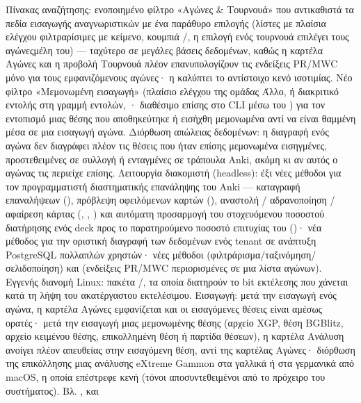 \documentclass[letterpaper,10pt,greek]{sphinxmanual}
\begin{document}
\begin{savenotes}
\begin{longtable}{}
\begin{varwidth}[t]{}
Πίνακας αναζήτησης: ενοποιημένο φίλτρο «Αγώνες \& Τουρνουά» που αντικαθιστά τα πεδία εισαγωγής αναγνωριστικών με ένα παράθυρο επιλογής (λίστες με πλαίσια ελέγχου φιλτραρίσιμες με κείμενο, κουμπιά /, η επιλογή ενός τουρνουά επιλέγει τους αγώνες\sphinxhyphen{}μέλη του) — ταχύτερο σε μεγάλες βάσεις δεδομένων, καθώς η καρτέλα Αγώνες και η προβολή Τουρνουά πλέον επανυπολογίζουν τις ενδείξεις PR/MWC μόνο για τους εμφανιζόμενους αγώνες· η  καλύπτει το αντίστοιχο κενό ισοτιμίας. Νέο φίλτρο «Μεμονωμένη εισαγωγή» (πλαίσιο ελέγχου της ομάδας Άλλο, ή διακριτικό εντολής  στη γραμμή εντολών, · διαθέσιμο επίσης στο CLI μέσω του ) για τον εντοπισμό μιας θέσης που αποθηκεύτηκε ή εισήχθη μεμονωμένα αντί να είναι θαμμένη μέσα σε μια εισαγωγή αγώνα. Διόρθωση απώλειας δεδομένων: η διαγραφή ενός αγώνα δεν διαγράφει πλέον τις θέσεις που ήταν επίσης μεμονωμένα εισηγμένες, προστεθειμένες σε συλλογή ή ενταγμένες σε τράπουλα Anki, ακόμη κι αν αυτός ο αγώνας τις περιείχε επίσης. Λειτουργία διακομιστή (headless): έξι νέες μέθοδοι για τον προγραμματιστή διαστηματικής επανάληψης του Anki — καταγραφή επαναλήψεων (), πρόβλεψη οφειλόμενων καρτών (), αναστολή / αδρανοποίηση / αφαίρεση κάρτας (, , ) και αυτόματη προσαρμογή του στοχευόμενου ποσοστού διατήρησης ενός deck προς το παρατηρούμενο ποσοστό επιτυχίας του ()· νέα μέθοδος  για την οριστική διαγραφή των δεδομένων ενός tenant σε ανάπτυξη PostgreSQL πολλαπλών χρηστών· νέες μέθοδοι  (φιλτράρισμα/ταξινόμηση/σελιδοποίηση) και  (ενδείξεις PR/MWC περιορισμένες σε μια λίστα αγώνων). Εγγενής διανομή Linux: πακέτα /, τα οποία διατηρούν το bit εκτέλεσης που χάνεται κατά τη λήψη του ακατέργαστου εκτελέσιμου. Εισαγωγή: μετά την εισαγωγή ενός αγώνα, η καρτέλα Αγώνες εμφανίζεται και οι εισαγόμενες θέσεις είναι αμέσως ορατές· μετά την εισαγωγή μιας μεμονωμένης θέσης (αρχείο XGP, θέση BGBlitz, αρχείο κειμένου θέσης, επικολλημένη θέση ή παρτίδα θέσεων), η καρτέλα Ανάλυση ανοίγει πλέον απευθείας στην εισαγόμενη θέση, αντί της καρτέλας Αγώνες· διόρθωση της επικόλλησης μιας ανάλυσης eXtreme Gammon στα γαλλικά ή στα γερμανικά από macOS, η οποία επέστρεφε κενή (τόνοι αποσυντεθειμένοι από το πρόχειρο του συστήματος). Βλ. {\hyperref[\detokenize{mode_headless:headless}]{}}, {\hyperref[\detokenize{cmd_mode:cmd-mode}]{}} και 
\end{varwidth}
\end{longtable}
\end{savenotes}
\end{document}
